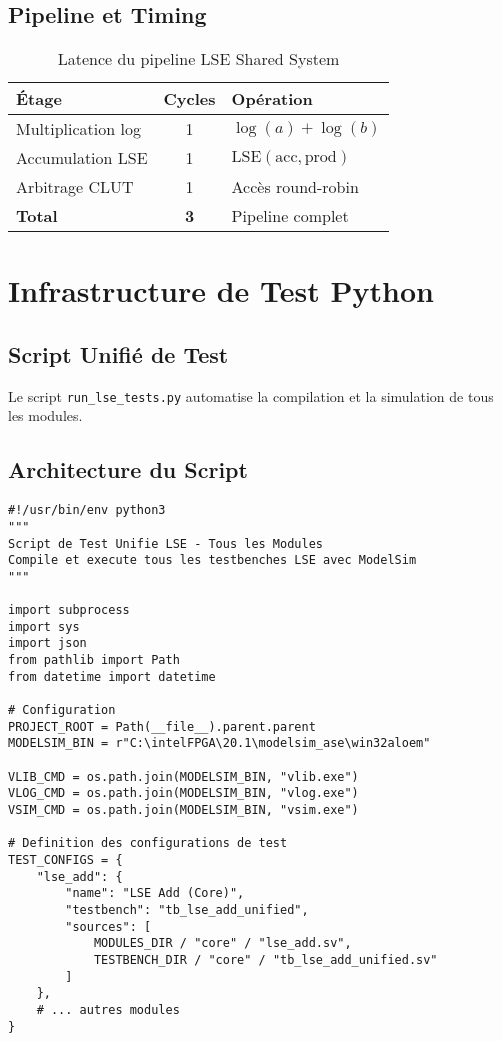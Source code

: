 \documentclass[12pt,a4paper]{article}
\begin{document}
\subsection{Pipeline et Timing}

\begin{table}[h]
\centering
\caption{Latence du pipeline LSE Shared System}
\begin{tabular}{|l|c|l|}
\hline
\textbf{Étage} & \textbf{Cycles} & \textbf{Opération} \\
\hline
Multiplication log & 1 & $\log(a) + \log(b)$ \\
Accumulation LSE & 1 & $\text{LSE}(\text{acc}, \text{prod})$ \\
Arbitrage CLUT & 1 & Accès round-robin \\
\hline
\textbf{Total} & \textbf{3} & Pipeline complet \\
\hline
\end{tabular}
\end{table}

\section{Infrastructure de Test Python}

\subsection{Script Unifié de Test}

Le script \texttt{run\_lse\_tests.py} automatise la compilation et la simulation de tous les modules.

\subsection{Architecture du Script}

\begin{lstlisting}[style=python, caption={Structure du script run\_lse\_tests.py}]
#!/usr/bin/env python3
"""
Script de Test Unifie LSE - Tous les Modules
Compile et execute tous les testbenches LSE avec ModelSim
"""

import subprocess
import sys
import json
from pathlib import Path
from datetime import datetime

# Configuration
PROJECT_ROOT = Path(__file__).parent.parent
MODELSIM_BIN = r"C:\intelFPGA\20.1\modelsim_ase\win32aloem"

VLIB_CMD = os.path.join(MODELSIM_BIN, "vlib.exe")
VLOG_CMD = os.path.join(MODELSIM_BIN, "vlog.exe")
VSIM_CMD = os.path.join(MODELSIM_BIN, "vsim.exe")

# Definition des configurations de test
TEST_CONFIGS = {
    "lse_add": {
        "name": "LSE Add (Core)",
        "testbench": "tb_lse_add_unified",
        "sources": [
            MODULES_DIR / "core" / "lse_add.sv",
            TESTBENCH_DIR / "core" / "tb_lse_add_unified.sv"
        ]
    },
    # ... autres modules
}
\end{lstlisting}
\end{document}
